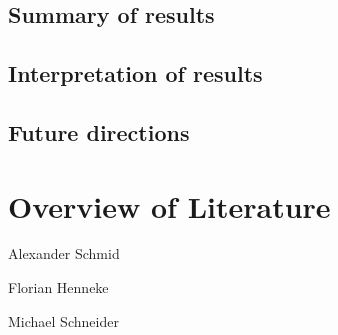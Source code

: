 \documentclass[conference]{IEEEtran}
\begin{document}
	\subsection{Summary of results}
	\subsection{Interpretation of results}
	\subsection{Future directions}

\section{Overview of Literature}
Alexander Schmid \cite{Akram2017} \cite{Arm2020} \cite{Asanovic2014} \cite{HeuiLee2001} \cite{Patterson2019} \cite{Perotti2020} \cite{Shore2015} \cite{Waterman2016} \cite{Xu2003}

Florian Henneke \cite{Waterman2016} \cite{Ryzhyk2006} \cite{Asanovic2014} \cite{Furber2000} \cite{Microsoft2020} \cite{Greenwaves2020} \cite{Aws2020} \cite{Microsoft2020}

Michael Schneider \cite{50years} \cite{hennessy2012computer} \cite{drechsler2020enhanced} \cite{WisconsinMadison2016} \cite{IEEE2018} \cite{Dirvin2019} \cite{Bandic2019}



\end{document}
